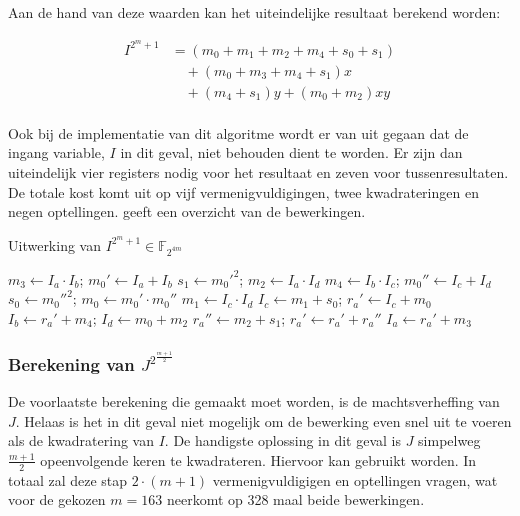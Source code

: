 Aan de hand van deze waarden kan het uiteindelijke resultaat berekend worden:

\[\begin{aligned}
I^{2^m + 1}	&= (m_0 + m_1 + m_2 + m_4 + s_0 + s_1)\\
				&\quad + (m_0 + m_3 + m_4 + s_1) x \\
				&\quad + (m_4 + s_1) y + (m_0 + m_2) xy\\
\end{aligned}\]

Ook bij de implementatie van dit algoritme wordt er van uit gegaan dat de ingang variable, $I$ in dit geval, niet behouden dient te worden. Er zijn dan uiteindelijk vier registers nodig voor het resultaat en zeven voor tussenresultaten. De totale kost komt uit op vijf vermenigvuldigingen, twee kwadrateringen en negen optellingen.  geeft een overzicht van de bewerkingen.


\begin{algorithm}[h]
	\caption{Uitwerking van $I^{2^m + 1} \in \mathbb{F}_{2^{4m}}$}
	\label{algoritme-implementatie-miller-v-power}
	$m_3 \leftarrow I_a \cdot I_b$; $m_0' \leftarrow I_a + I_b$\;
	$s_1 \leftarrow m_0'^2$; $m_2 \leftarrow I_a \cdot I_d$\;
	$m_4 \leftarrow I_b \cdot I_c$; $m_0'' \leftarrow I_c + I_d$\;
	$s_0 \leftarrow m_0''^2$; $m_0 \leftarrow m_0' \cdot m_0''$\;
	$m_1 \leftarrow I_c \cdot I_d$\;
	$I_c \leftarrow m_1 + s_0$; $r_a' \leftarrow I_c + m_0$\;
	$I_b \leftarrow r_a' + m_4$; $I_d \leftarrow m_0 + m_2$\;
	$r_a'' \leftarrow m_2 + s_1$; $r_a' \leftarrow r_a' + r_a''$\;
	$I_a \leftarrow r_a' + m_3$\;
\end{algorithm}

\subsubsection{Berekening van $J^{2^{\frac{m + 1}{2}}}$}

De voorlaatste berekening die gemaakt moet worden, is de machtsverheffing van $J$. Helaas is het in dit geval niet mogelijk om de bewerking even snel uit te voeren als de kwadratering van $I$. De handigste oplossing in dit geval is $J$ simpelweg $\frac{m + 1}{2}$ opeenvolgende keren te kwadrateren. Hiervoor kan  gebruikt worden. In totaal zal deze stap $2 \cdot (m + 1)$ vermenigvuldigigen en optellingen vragen, wat voor de gekozen $m = 163$ neerkomt op 328 maal beide bewerkingen.

